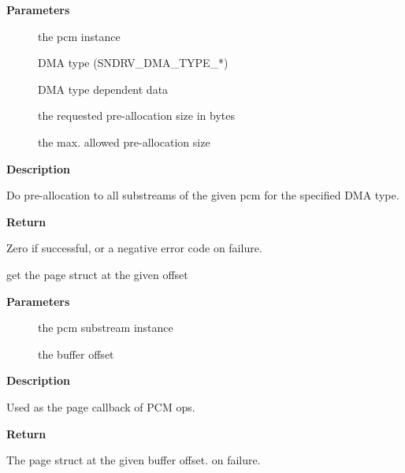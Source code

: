 \documentclass[a4paper,8pt,english]{sphinxmanual}
\begin{document}
\textbf{Parameters}
\begin{description}
\item[{}] \leavevmode
the pcm instance

\item[{}] \leavevmode
DMA type (SNDRV\_DMA\_TYPE\_*)

\item[{}] \leavevmode
DMA type dependent data

\item[{}] \leavevmode
the requested pre-allocation size in bytes

\item[{}] \leavevmode
the max. allowed pre-allocation size

\end{description}

\textbf{Description}

Do pre-allocation to all substreams of the given pcm for the
specified DMA type.

\textbf{Return}

Zero if successful, or a negative error code on failure.

\begin{fulllineitems}
\label{sound/kernel-api/alsa-driver-api:c.snd_pcm_sgbuf_ops_page}
get the page struct at the given offset

\end{fulllineitems}


\textbf{Parameters}
\begin{description}
\item[{}] \leavevmode
the pcm substream instance

\item[{}] \leavevmode
the buffer offset

\end{description}

\textbf{Description}

Used as the page callback of PCM ops.

\textbf{Return}

The page struct at the given buffer offset.  on failure.
\end{document}
